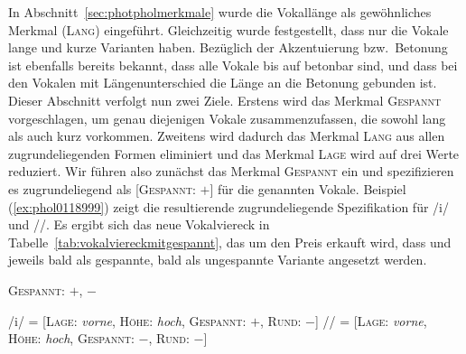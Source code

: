 In Abschnitt~\ref{sec:photpholmerkmale} wurde die Vokallänge als gewöhnliches Merkmal (\textsc{Lang}) eingeführt.
Gleichzeitig wurde festgestellt, dass nur die Vokale \textipa{[i y u e \o\ E o a]} lange und kurze Varianten haben.
Bezüglich der Akzentuierung bzw.\ Betonung ist ebenfalls bereits bekannt, dass alle Vokale bis auf \textipa{[@ 5]} betonbar sind, und dass bei den Vokalen mit Längenunterschied die Länge an die Betonung gebunden ist.
Dieser Abschnitt verfolgt nun zwei Ziele.
Erstens wird das Merkmal \textsc{Gespannt} vorgeschlagen, um genau diejenigen Vokale zusammenzufassen, die sowohl lang als auch kurz vorkommen.
Zweitens wird dadurch das Merkmal \textsc{Lang} aus allen zugrundeliegenden Formen eliminiert und das Merkmal \textsc{Lage} wird auf drei Werte reduziert.
Wir führen also zunächst das Merkmal \textsc{Gespannt} ein und spezifizieren es zugrundeliegend als [\textsc{Gespannt}: $+$] für die genannten Vokale.
Beispiel (\ref{ex:phol0118999}) zeigt die resultierende zugrundeliegende Spezifikation für /i/ und //.
Es ergibt sich das neue Vokalviereck in Tabelle~\ref{tab:vokalviereckmitgespannt}, das um den Preis erkauft wird, dass \textipa{[E]} und \textipa{[a]} jeweils bald als gespannte, bald als ungespannte Variante angesetzt werden.

\begin{exe}
  \ex \textsc{Gespannt}: $+$, $-$
  \ex\label{ex:phol0118999}
  \begin{xlist}
  	\ex /i/ = [\textsc{Lage}: \textit{vorne}, \textsc{Höhe}: \textit{hoch}, \textsc{Gespannt}: $+$, \textsc{Rund}: $-$]
  	\ex // = [\textsc{Lage}: \textit{vorne}, \textsc{Höhe}: \textit{hoch}, \textsc{Gespannt}: $-$, \textsc{Rund}: $-$]
  \end{xlist}
\end{exe}

